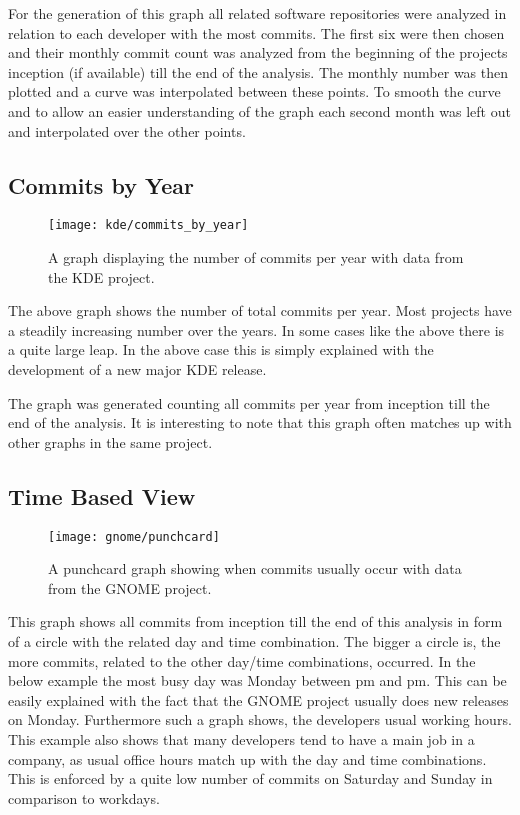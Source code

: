 For the generation of this graph all related software repositories were
analyzed in relation to each developer with the most commits. The first six
were then chosen and their monthly commit count was analyzed from the beginning
of the projects inception (if available) till the end of the analysis. The
monthly number was then plotted and a curve was interpolated between these
points. To smooth the curve and to allow an easier understanding of the graph
each second month was left out and interpolated over the other points.


\subsection{Commits by Year} %

\begin{figure}[h!t]
  \centering
  \texttt{[image: kde/commits\_by\_year]}
  \caption{A graph displaying the number of commits per year with data from the
  KDE project.}
\end{figure}

The above graph shows the number of total commits per year. Most projects have
a steadily increasing number over the years. In some cases like the above there
is a quite large leap. In the above case this is simply explained with the
development of a new major KDE release.

The graph was generated counting all commits per year from inception till the
end of the analysis. It is interesting to note that this graph often matches up
with other graphs in the same project.


\subsection{Time Based View} %

\begin{figure}[h!t]
  \centering
  \texttt{[image: gnome/punchcard]}
  \caption{A punchcard graph showing when commits usually occur with data from
  the GNOME project.}
\end{figure}

This graph shows all commits from inception till the end of this analysis in
form of a circle with the related day and time combination. The bigger a circle
is, the more commits, related to the other day/time combinations, occurred. In
the below example the most busy day was Monday between \unit[4]{pm} and
\unit[12]{pm}. This can be easily explained with the fact that the GNOME
project usually does new releases on Monday. Furthermore such a graph shows,
the developers usual working hours. This example also shows that many
developers tend to have a main job in a company, as usual office hours match up
with the day and time combinations. This is enforced by a quite low number of
commits on Saturday and Sunday in comparison to workdays.

